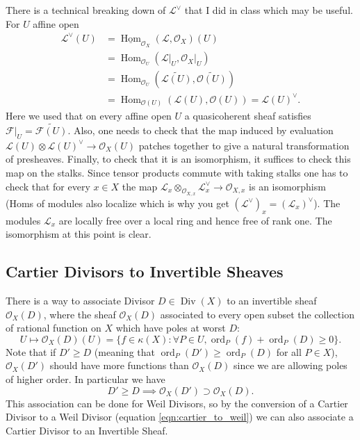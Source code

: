 \documentclass[12pt]{article}
\numberwithin{equation}{section}
\theoremstyle{definition}
\theoremstyle{remark}
\newcommand{\Hom}{\operatorname{Hom}}
\newcommand{\Ocal}{\mathcal{O}}
\newcommand{\ord}{\operatorname{ord}}
\newcommand{\Div}{\operatorname{Div}}
\newcommand{\Lcal}{\mathcal{L}}
\newcommand{\Fcal}{\mathcal{F}}
\begin{document}
There is a technical breaking down of $\Lcal^{\vee}$ that I did in class which may be useful. 
For $U$ affine open
\begin{align*}
  \Lcal^{\vee}(U) &= \underline{\Hom}_{\Ocal_X}(\Lcal,\Ocal_X)(U) \\
  &= \Hom_{\Ocal_U}(\Lcal\vert_U, \Ocal_X\vert_U)\\
  &= \Hom_{\Ocal_U}(\widetilde{\Lcal(U)},\widetilde{\Ocal(U)})\\
  &= \Hom_{\Ocal(U)}(\Lcal(U),\Ocal(U)) = \Lcal(U)^{\vee}.
\end{align*}
Here we used that on every affine open $U$ a quasicoherent sheaf satisfies $\Fcal\vert_U = \widetilde{\Fcal(U)}$.
Also, one needs to check that the map induced by evaluation $\Lcal(U)\otimes\Lcal(U)^{\vee} \to \Ocal_X(U)$ patches together to give a natural transformation of presheaves. 
Finally, to check that it is an isomorphism, it suffices to check this map on the stalks. 
Since tensor products commute with taking stalks one has to check that for every $x\in X$ the map $\Lcal_x\otimes_{\Ocal_{X,x}} \Lcal^{\vee}_x \to \Ocal_{X,x}$ is an isomorphism (Homs of modules also localize which is why you get $(\Lcal^{\vee})_x = (\Lcal_x)^{\vee}$). 
The modules $\Lcal_x$ are locally free over a local ring and hence free of rank one. 
The isomorphism at this point is clear.


\subsection{Cartier Divisors to Invertible Sheaves}

There is a way to associate Divisor $D\in\Div(X)$ to an invertible sheaf $\Ocal_X(D)$, where the sheaf $\Ocal_X(D)$ associated to every open subset the collection of rational function on $X$ which have poles at worst $D$:
$$U \mapsto \Ocal_X(D)(U) = \lbrace f\in \kappa(X) : \forall P\in U, \ord_P(f)+\ord_P(D) \geq 0 \rbrace.$$
Note that if $D'\geq D$ (meaning that $\ord_P(D')\geq \ord_P(D)$ for all $P\in X$), $\Ocal_X(D')$ should have more functions than $\Ocal_X(D)$ since we are allowing poles of higher order. In particular we have
$$D'\geq D \implies \Ocal_X(D') \supset \Ocal_X(D).$$
This association can be done for Weil Divisors, so by the conversion of a Cartier Divisor to a Weil Divisor (equation \ref{eqn:cartier_to_weil}) we can also associate a Cartier Divisor to an Invertible Sheaf. 
\end{document}
